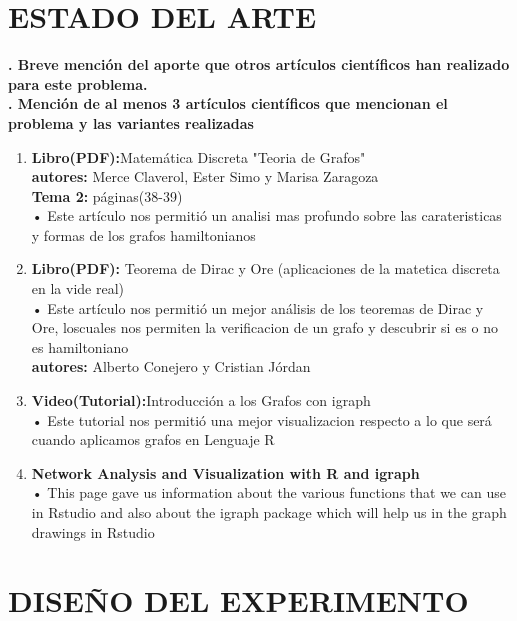 \documentclass[journal]{IEEEtran}
\begin{document}
\section{ESTADO DEL ARTE}
{\bf . Breve menci{\'o}n del aporte que otros art{\'i}culos cient{\'i}ficos han realizado para este problema.\\
. Menci{\'o}n de al menos 3 art{\'i}culos científicos que mencionan el problema y las variantes realizadas}
\begin{enumerate}

\item \textbf{Libro(PDF):}Matem{\'a}tica Discreta "Teoria de Grafos"\\
\textbf{autores:} Merce Claverol, Ester Simo y Marisa Zaragoza\\
\textbf{Tema 2:} p{\'a}ginas(38-39)\\[1cm]
• Este art{\'i}culo nos permiti{\'o} un analisi mas profundo sobre las carateristicas y formas de los grafos hamiltonianos\\
\item \textbf{Libro(PDF):} Teorema de Dirac y Ore (aplicaciones de la matetica discreta en la vide real)\\[1cm]
• Este art{\'i}culo nos permiti{\'o} un mejor an{\'a}lisis de los teoremas de Dirac y Ore, loscuales nos permiten la verificacion de un grafo y descubrir si es o no es hamiltoniano\\ 
\textbf{autores:} Alberto Conejero y Cristian J{\'o}rdan\\[1cm]  
\item \textbf{Video(Tutorial):}Introducci{\'o}n a los Grafos con igraph\\[1cm]
• Este tutorial nos permiti{\'o} una mejor visualizacion respecto a lo que ser{\'a} cuando aplicamos grafos en Lenguaje R\\
\item \textbf{Network Analysis and Visualization with R and igraph}\\[1cm]
• This page gave us information about the various functions that we can use in Rstudio and also about the igraph package which will help us in the graph drawings in Rstudio\\[10cm]
\end{enumerate}


\section{DISE\~{N}O DEL EXPERIMENTO}
\end{document}
